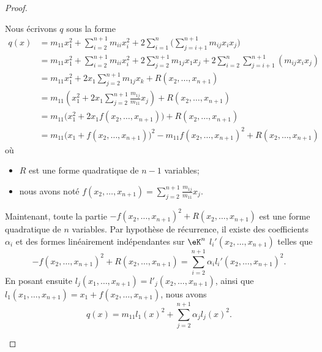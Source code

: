 \begin{proof}
	\begin{subproof}
		\spitem[Si \( m_{11}\neq 0\)]
		Nous écrivons \( q\) sous la forme
		\begin{subequations}
			\begin{align}
				q(x) & =m_{11}x_1^2+\sum_{i=2}^{n+1}m_{ii}x_i^2+2\sum_{i=1}^n\big( \sum_{j=i+1}^{n+1}m_{ij}x_ix_j \big)                     \\
				     & =m_{11}x_1^2+\sum_{i=2}^{n+1}m_{ii}x_i^2+2\sum_{j=2}^{n+1}m_{1j}x_1x_j+2\sum_{i=2}^n\sum_{j=i+1}^{n+1}(m_{ij}x_ix_j) \\
				     & =m_{11}x_1^2+2x_1\sum_{j=2}^{n+1}m_{1j}x_k+R(x_2,\ldots, x_{n+1})                                                    \\
				     & =m_{11}\left( x_1^2+2x_1\sum_{j=2}^{n+1}\frac{ m_{1j} }{ m_{11} }x_j \right)+R(x_2,\ldots, x_{n+1})                  \\
				     & =m_{11}\big( x_1^2+2x_1f(x_2,\ldots, x_{n+1}) \big)+R(x_2,\ldots, x_{n+1})                                           \\
				     & =m_{11}\big( x_1+f(x_2,\ldots, x_{n+1}) \big)^2-m_{11}f(x_2,\ldots, x_{n+1})^2+R(x_2,\ldots, x_{n+1})
			\end{align}
		\end{subequations}
		où
		\begin{itemize}
			\item \( R\) est une forme quadratique de \( n-1\) variables;
			\item nous avons noté \( f(x_2,\ldots, x_{n+1})=\sum_{j=2}^{n+1}\frac{ m_{1j} }{ m_{11} }x_j\).
		\end{itemize}
		Maintenant, toute la partie \( -f(x_2,\ldots, x_{n+1})^2+R(x_2,\ldots, x_{n+1})\) est une forme quadratique de \( n\) variables. Par hypothèse de récurrence, il existe des coefficients \( \alpha_i\) et des formes linéairement indépendantes sur \( \eK^n\) \( l_i'(x_2,\ldots, x_{n+1})\) telles que
		\begin{equation}
			-f(x_2,\ldots, x_{n+1})^2+R(x_2,\ldots, x_{n+1})=\sum_{i=2}^{n+1}\alpha_il_i'(x_2,\ldots, x_{n+1})^2.
		\end{equation}
		En posant ensuite \( l_j(x_1,\ldots, x_{n+1})=l'_j(x_2,\ldots, x_{n+1})\), ainsi que \( l_1(x_1,\ldots, x_{n+1})=x_1+f(x_2,\ldots, x_{n+1})\), nous avons
		\begin{equation}
			q(x)=m_{11}l_1(x)^2+\sum_{j=2}^{n+1}\alpha_jl_j(x)^2.
		\end{equation}



\end{subproof}
\end{proof}

